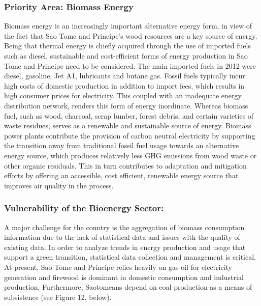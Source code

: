 \documentclass[
]{book}
\begin{document}
\hypertarget{priority-area-biomass-energy}{%
\subsubsection{Priority Area: Biomass Energy}\label{priority-area-biomass-energy}}

Biomass energy is an increasingly important alternative energy form, in view of the fact that Sao Tome and Principe's wood resources are a key source of energy. Being that thermal energy is chiefly acquired through the use of imported fuels such as diesel, sustainable and cost-efficient forms of energy production in Sao Tome and Principe need to be considered. The main imported fuels in 2012 were diesel, gasoline, Jet A1, lubricants and butane gas. Fossil fuels typically incur high costs of domestic production in addition to import fees, which results in high consumer prices for electricity. This coupled with an inadequate energy distribution network, renders this form of energy inordinate. Whereas biomass fuel, such as wood, charcoal, scrap lumber, forest debris, and certain varieties of waste residues, serves as a renewable and sustainable source of energy. Biomass power plants contribute the provision of carbon neutral electricity by supporting the transition away from traditional fossil fuel usage towards an alternative energy source, which produces relatively less GHG emissions from wood waste or other organic residuals. This in turn contributes to adaptation and mitigation efforts by offering an accessible, cost efficient, renewable energy source that improves air quality in the process.

\hypertarget{vulnerability-of-the-bioenergy-sector}{%
\subsubsection{Vulnerability of the Bioenergy Sector:}\label{vulnerability-of-the-bioenergy-sector}}

A major challenge for the country is the aggregation of biomass consumption information due to the lack of statistical data and issues with the quality of existing data. In order to analyze trends in energy production and usage that support a green transition, statistical data collection and management is critical. At present, Sao Tome and Principe relies heavily on gas oil for electricity generation and firewood is dominant in domestic consumption and industrial production. Furthermore, Saotomeans depend on coal production as a means of subsistence (see Figure 12, below).
\end{document}
